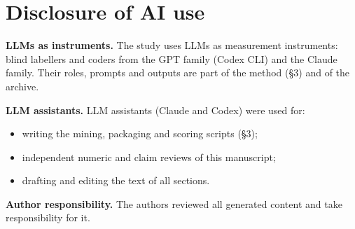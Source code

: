 \documentclass[acmsmall,screen,review,anonymous]{acmart}
\begin{document}
\section{Disclosure of AI use}
\textbf{LLMs as instruments.} The study uses LLMs as measurement instruments: blind labellers and coders from the GPT family (Codex CLI) and the Claude family. Their roles, prompts and outputs are part of the method (\S{}3) and of the archive.

\textbf{LLM assistants.} LLM assistants (Claude and Codex) were used for:
\begin{itemize}
\item writing the mining, packaging and scoring scripts (\S{}3);
\item independent numeric and claim reviews of this manuscript;
\item drafting and editing the text of all sections.
\end{itemize}

\textbf{Author responsibility.} The authors reviewed all generated content and take responsibility for it.



\end{document}

